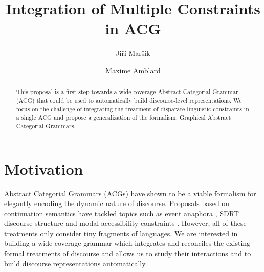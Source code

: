 \documentclass{llncs}
\begin{document}
%
\frontmatter          %
%
\pagestyle{headings}  %

\mainmatter              %
%
\title{Integration of Multiple Constraints in ACG}
%
%
\author{Jiří Maršík \and Maxime Amblard}
%
%
%

\maketitle              %

\begin{abstract}
This proposal is a first step towards a wide-coverage Abstract Categorial
Grammar (ACG) that could be used to automatically build discourse-level
representations. We focus on the challenge of integrating the treatment of
disparate linguistic constraints in a single ACG and propose a generalization
of the formalism: Graphical Abstract Categorial Grammars.
\end{abstract}


\section{Motivation}

Abstract Categorial Grammars (ACGs) \cite{de2001towards} have shown to be a
viable formalism for elegantly encoding the dynamic nature of
discourse. Proposals based on continuation semantics \cite{de2006towards} have
tackled topics such as event anaphora \cite{qian2011event}, SDRT discourse
structure \cite{asher2011sdrt} and modal accessibility constraints
\cite{asher2011montagovian}. However, all of these treatments only consider
tiny fragments of languages. We are interested in building a wide-coverage
grammar which integrates and reconciles the existing formal treatments of
discourse and allows us to study their interactions and to build discourse
representations automatically.
\end{document}
